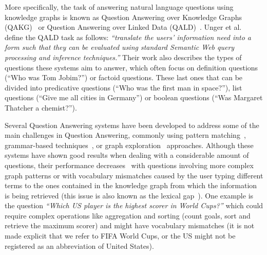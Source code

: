 More specifically, the task of answering natural language questions using knowledge graphs 
is known as Question Answering over Knowledge Graphs (QAKG)~\cite{qa:nn-qakg-Chakraborty19} or Question 
Answering over Linked Data (QALD)~\cite{qa:intro-UngerFC14, qa:qald-Lopezetal2013}. Unger et al.~\cite{qa:intro-UngerFC14} define the QALD task
as follows: \textit{“translate the users’ information need into a form such that they can be evaluated using 
standard Semantic Web query processing and inference techniques.”} Their work also describes 
the types of questions these systems aim to answer, which often focus on definition questions 
(“Who was Tom Jobim?”) or factoid questions. These last ones that can be divided into 
predicative questions (“Who was the first man in space?”), list questions (“Give me all cities 
in Germany”) or boolean questions (“Was Margaret Thatcher a chemist?”). 

Several Question Answering systems have been developed to address some of the main 
challenges in Question Answering, commonly using pattern matching~\cite{qa:pattern-FaderZE13, qa:pattern-LopezFMS12}, 
grammar-based techniques~\cite{qa:grammar-DamljanovicAC10, qa:grammar-2-Marginean17}, 
or graph exploration~\cite{qa:graph-XuFZ14, qa:graph-2-ZouHWYHZ14} approaches. Although these systems have 
shown good results when dealing with a considerable amount of questions, their performance 
decreases~\cite{qa:challenges-semweb-HoffnerWMULN17} with questions involving more complex graph patterns or with vocabulary 
mismatches caused by the user typing different terms to the ones contained in the knowledge 
graph from which the information is being retrieved (this issue is also known as the lexical gap~\cite{semPar:lexical-gap-HakimovUWC15}). One example 
is the question \textit{“Which US player is the highest scorer in World Cups?”} which could require 
complex operations like aggregation and sorting (count goals, sort and retrieve the maximum 
scorer) and might have vocabulary mismatches (it is not made explicit that we refer to FIFA World 
Cups, or the US might not be registered as an abbreviation of United States).

